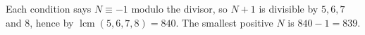 Each condition says $N\equiv-1$ modulo the divisor, so $N+1$ is divisible by $5,6,7$ and $8$, hence by $\operatorname{lcm}(5,6,7,8)=840$. The smallest positive $N$ is $840-1=\boxed{839}$.
